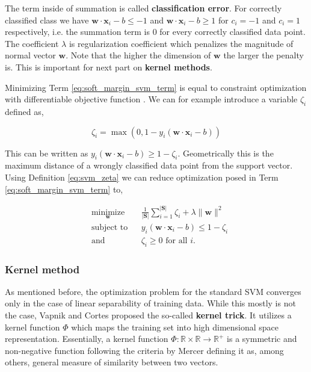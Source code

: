 \documentclass[pdftex,12pt,a4paper]{report}
\begin{document}
The term inside of summation is called \textbf{classification error}. For correctly classified class we have $\mathbf{w} \cdot \mathbf{x}_i - b \leq -1$ and $\mathbf{w} \cdot \mathbf{x}_i - b \geq 1$ for $c_i = -1$ and $c_i = 1$ respectively, i.e. the summation term is $0$ for every correctly classified data point. The coefficient $\lambda$ is regularization coefficient which penalizes the magnitude of normal vector $\mathbf{w}$. Note that the higher the dimension of $\mathbf{w}$ the larger the penalty is. This is important for next part on \textbf{kernel methods}.

Minimizing Term \ref{eq:soft_margin_svm_term} is equal to constraint optimization with differentiable objective function \cite{nocedal2006numerical}. We can for example introduce a variable $\zeta_i$ defined as,

\begin{equation}
\zeta_i = \max(0, 1 - y_i(\mathbf{w} \cdot \mathbf{x}_i - b))
\label{eq:svm_zeta}
\end{equation}

This can be written as $y_i(\mathbf{w} \cdot \mathbf{x}_i - b) \geq 1 - \zeta_i$. Geometrically this is the maximum distance of a wrongly classified data point from the support vector. Using Definition \ref{eq:svm_zeta} we can reduce optimization posed in Term \ref{eq:soft_margin_svm_term} to,

\begin{equation*}
\begin{aligned}
& \underset{\mathbf{
w}}{\text{minimize}}
& & \frac{1}{\vert \mathbf{S} \vert} \sum_{i=1}^{\vert \mathbf{S} \vert} \zeta_i + \lambda \| \mathbf{w} \|^2 \\
& \text{subject to}
& & y_i (\mathbf{w} \cdot \mathbf{x}_i - b) \leq 1 - \zeta_i \\
& \text{and} && \zeta_i \geq 0 \text{ for all } i.
\end{aligned}
\end{equation*}

\subsubsection*{Kernel method}

As mentioned before, the optimization problem for the standard SVM converges only in the case of linear separability of training data. While this mostly is not the case, Vapnik and Cortes \cite{cortes1995support} proposed the so-called \textbf{kernel trick}. It utilizes a kernel function $\Phi$ which maps the training set into high dimensional space representation. Essentially, a kernel function $\Phi: \mathbb{R} \times \mathbb{R} \rightarrow \mathbb{R}^+$ is a symmetric and non-negative function following the criteria by Mercer \cite{mercer1909functions} defining it as, among others, general measure of similarity between two vectors.
\end{document}
